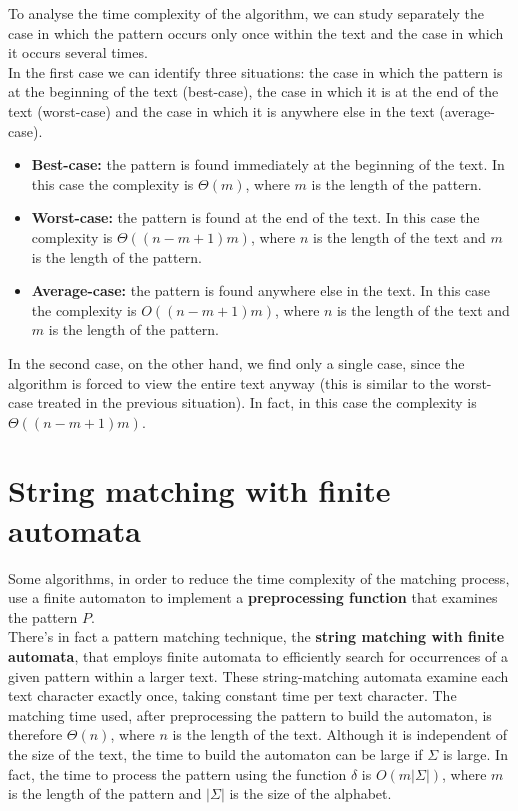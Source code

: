 \documentclass[11pt]{article}
\begin{document}
            To analyse the time complexity of the algorithm, we can study separately the case in which the pattern occurs only once within the text and the case in which it occurs several times. \\
            In the first case we can identify three situations: the case in which the pattern is at the beginning of the text (best-case),
            the case in which it is at the end of the text (worst-case) and the case in which it is anywhere else in the text (average-case).

            \begin{itemize}
                \item \textbf{Best-case:} the pattern is found immediately at the beginning of the text. In this case the complexity is $\Theta(m)$, where $m$ is the length of the pattern.
                \item \textbf{Worst-case:} the pattern is found at the end of the text. In this case the complexity is $\Theta((n - m + 1)m)$, where $n$ is the length of the text and $m$ is the length of the pattern.
                \item \textbf{Average-case:} the pattern is found anywhere else in the text. In this case the complexity is $O((n - m + 1)m)$, where $n$ is the length of the text and $m$ is the length of the pattern.
            \end{itemize}

            \noindent In the second case, on the other hand, we find only a single case, since the algorithm is forced to view the entire text anyway
            (this is similar to the worst-case treated in the previous situation). In fact, in this case the complexity is $\Theta((n - m + 1)m)$. \\

    \section{String matching with finite automata} \label{sec:string_matching_with_finite_automata}

        Some algorithms, in order to reduce the time complexity of the matching process, use a finite automaton to implement a \textbf{preprocessing function} that examines the pattern $P$. \\
        There's in fact a pattern matching technique, the \textbf{string matching with finite automata}, that employs finite automata to efficiently search for occurrences of a given pattern within a larger text.
        These string-matching automata examine each text character exactly once, taking constant time per text character.
        The matching time used, after preprocessing the pattern to build the automaton, is therefore $\Theta(n)$, where $n$ is the length of the text.
        Although it is independent of the size of the text, the time to build the automaton can be large if $\Sigma$ is large.
        In fact, the time to process the pattern using the function $\delta$ is $O(m\lvert\Sigma\rvert)$, where $m$ is the length of the pattern and $\lvert\Sigma\rvert$ is the size of the alphabet. \\
\end{document}
